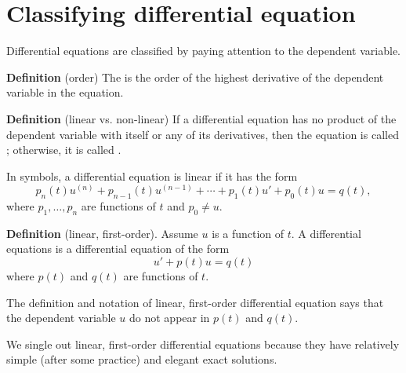 \documentclass[../main.tex]{subfiles}
\begin{document}
 \section{Classifying differential equation}

Differential equations are classified by paying attention to the dependent variable. 

\begin{mdframed}[style=simple-compact]
  \textbf{Definition} (order) The  is the order of the highest derivative of the dependent variable in the equation.
\end{mdframed}

\begin{mdframed}[style=simple-compact]
  \textbf{Definition} (linear vs. non-linear) If a differential equation has no product of the dependent variable with itself or any of its derivatives, then the equation is called ; otherwise, it is called . 

  In symbols, a differential equation is linear if it has the form
  \[
    p_{n}(t) u^{(n)} + p_{n-1}(t) u^{(n-1)} + \cdots + p_{1}(t) u' + p_{0}(t) u = q(t),
  \]
  where \(p_{1}, \ldots, p_{n}\) are functions of \(t\) and \(p_{0} \ne u\).
\end{mdframed}

\begin{mdframed}[style=simple-compact]
  \textbf{Definition} (linear, first-order). Assume \(u\) is a function of \(t\). A  differential equations is a differential equation of the form
  \[
    u' + p(t) u = q(t)
  \]
  where \(p(t)\) and \(q(t)\) are functions of \(t\).
\end{mdframed}

\faPencil*{} The definition and notation of linear, first-order differential equation says that the dependent variable \(u\) do not appear in \(p(t)\) and \(q(t)\).

We single out linear, first-order differential equations because they have relatively simple (after some practice) and elegant exact solutions. 
\end{document}
